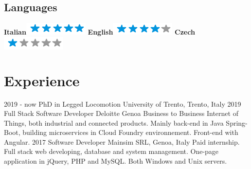 \documentclass[]{friggeri-cv}
\begin{document}
\begin{aside}
  \section{Languages}
    \textbf{Italian}\includegraphics[scale=0.40]{img/5stars.png}
    \textbf{English}\includegraphics[scale=0.40]{img/4stars.png}
    \textbf{Czech}\includegraphics[scale=0.40]{img/1stars.png}    
\end{aside}

\section{Experience}
\begin{entrylist}
  \entry
	{2019 - now}
	{PhD in Legged Locomotion}
	{University of Trento, Trento, Italy}
	{}
  \entry
	{2019}
	{Full Stack Software Developer}
	{Deloitte Genoa}
	{Business to Business Internet of Things, both industrial and connected products. Mainly back-end in Java Spring-Boot, building microservices in Cloud Foundry environnement. Front-end with Angular. }
  \entry
    {2017}
    {Software Developer}
    {Mainsim SRL, Genoa, Italy}
    {Paid internship. Full stack web developing, database and system management. One-page application in jQuery, PHP and MySQL. Both Windows and Unix servers.}
\end{entrylist}
\end{document}
